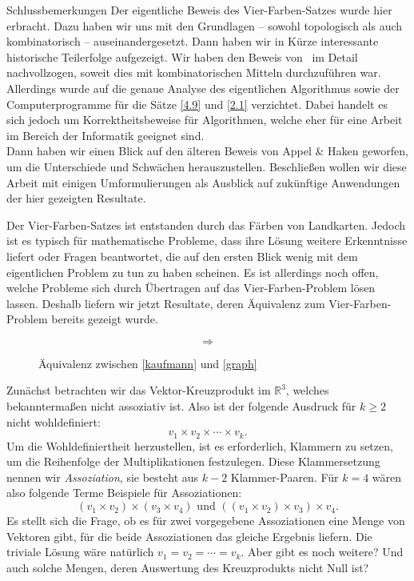 \begin{chapter}{Schlussbemerkungen}
 Der eigentliche Beweis des Vier-Farben-Satzes wurde hier erbracht. Dazu haben wir uns mit den Grundlagen -- sowohl topologisch als auch kombinatorisch -- auseinandergesetzt. Dann haben wir in Kürze interessante historische Teilerfolge aufgezeigt. Wir haben den Beweis von \rsst\-\ im Detail nachvollzogen, soweit dies mit kombinatorischen Mitteln durchzuführen war. Allerdings wurde auf die genaue Analyse des eigentlichen Algorithmus sowie der Computerprogramme für die Sätze \ref{4.9} und \ref{2.1} verzichtet. Dabei handelt es sich jedoch um Korrektheitsbeweise für Algorithmen, welche eher für eine Arbeit im Bereich der Informatik geeignet sind.\\
 Dann haben wir einen Blick auf den älteren Beweis von Appel \& Haken geworfen, um die Unterschiede und Schwächen herauszustellen. Beschließen wollen wir diese Arbeit mit einigen Umformulierungen als Ausblick auf zukünftige Anwendungen der hier gezeigten Resultate.

 Der Vier-Farben-Satzes ist entstanden durch das Färben von Landkarten. Jedoch ist es typisch für mathematische Probleme, dass ihre Lösung weitere Erkenntnisse liefert oder Fragen beantwortet, die auf den ersten Blick wenig mit dem eigentlichen Problem zu tun zu haben scheinen. Es ist allerdings noch offen, welche Probleme sich durch Übertragen auf das Vier-Farben-Problem lösen lassen. Deshalb liefern wir jetzt Resultate, deren Äquivalenz zum Vier-Farben-Problem bereits gezeigt wurde.
 
 \begin{figure}[hb]
  \label{kaufmannaequiv}
  \[  \Rightarrow  \]
  \caption[Äquivalenz zwischen \ref{kaufmann} und \ref{graph}]{Äquivalenz zwischen \ref{kaufmann} und \ref{graph}}
 \end{figure}
 
 Zunächst betrachten wir das Vektor-Kreuzprodukt im $\mathbb{R}^3$, welches bekanntermaßen nicht assoziativ ist. Also ist der folgende Ausdruck für $k \geq 2$ nicht wohldefiniert:
 \[ v_1 \times v_2 \times \cdots \times v_k \text{.}\]
 Um die Wohldefiniertheit herzustellen, ist es erforderlich, Klammern zu setzen, um die Reihenfolge der Multiplikationen festzulegen. Diese Klammersetzung nennen wir \textit{Assoziation}, sie besteht aus $k-2$ Klammer-Paaren. Für $k=4$ wären also folgende Terme Beispiele für Assoziationen:
 \[ (v_1 \times v_2) \times (v_3 \times v_4) \text{ und } ((v_1 \times v_2) \times v_3) \times v_4 \text{.}\]
 Es stellt sich die Frage, ob es für zwei vorgegebene Assoziationen eine Menge von Vektoren gibt, für die beide Assoziationen das gleiche Ergebnis liefern. Die triviale Lösung wäre natürlich $v_1 = v_2 = \cdots = v_k$. Aber gibt es noch weitere? Und auch solche Mengen, deren Auswertung des Kreuzprodukts nicht Null ist?
 

\end{chapter}
